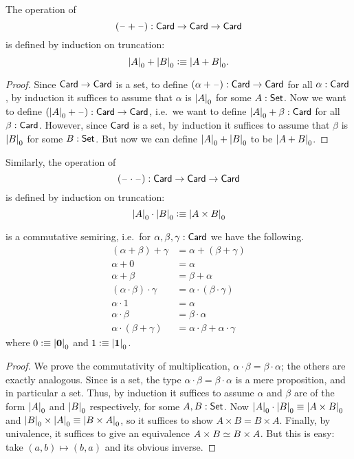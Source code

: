 \begin{defn}
  The operation of 
  \[ (\blank+\blank) : \card \to \card \to \card \]
  is defined by induction on truncation:
  \[ \cd{A} + \cd{B} \defeq \cd{A+B}.\]
\end{defn}
\begin{proof}
  Since $\card\to\card$ is a set, to define $(\alpha+\blank):\card\to\card$ for all $\alpha:\card$, by induction it suffices to assume that $\alpha$ is $\cd{A}$ for some $A:\set$.
  Now we want to define $(\cd{A}+\blank) :\card\to\card$, i.e.\ we want to define $\cd{A}+\beta :\card$ for all $\beta:\card$.
  However, since $\card$ is a set, by induction it suffices to assume that $\beta$ is $\cd{B}$ for some $B:\set$.
  But now we can define $\cd{A}+\cd{B}$ to be $\cd{A+B}$.
\end{proof}

\begin{defn}
  Similarly, the operation of 
  \[ (\blank\cdot\blank) : \card \to \card \to \card \]
  is defined by induction on truncation:
  \[ \cd{A} \cdot \cd{B} \defeq \cd{A\times B} \]
\end{defn}

\begin{lem}\label{card:semiring}
  \card is a commutative semiring, i.e.\ for $\alpha,\beta,\gamma:\card$ we have the following.
  \begin{align*}
    (\alpha+\beta)+\gamma &= \alpha+(\beta+\gamma)\\
    \alpha+0 &= \alpha\\
    \alpha + \beta &= \beta + \alpha\\
    (\alpha \cdot \beta) \cdot \gamma &= \alpha \cdot (\beta\cdot\gamma)\\
    \alpha \cdot 1 &= \alpha\\
    \alpha\cdot\beta &= \beta\cdot\alpha\\
    \alpha\cdot(\beta+\gamma) &= \alpha\cdot\beta + \alpha\cdot\gamma
  \end{align*}
  where $0 \defeq \cd{\emptyt}$ and $1\defeq\cd{\unit}$.
\end{lem}
\begin{proof}
  We prove the commutativity of multiplication, $\alpha\cdot\beta = \beta\cdot\alpha$; the others are exactly analogous.
  Since \card is a set, the type $\alpha\cdot\beta = \beta\cdot\alpha$ is a mere proposition, and in particular a set.
  Thus, by induction it suffices to assume $\alpha$ and $\beta$ are of the form $\cd{A}$ and $\cd{B}$ respectively, for some $A,B:\set$.
  Now $\cd{A}\cdot \cd{B} \jdeq \cd{A\times B}$ and $\cd{B}\times\cd{A} \jdeq \cd{B\times A}$, so it suffices to show $A\times B = B\times A$.
  Finally, by univalence, it suffices to give an equivalence $A\times B \eqvsym B\times A$.
  But this is easy: take $(a,b) \mapsto (b,a)$ and its obvious inverse.
\end{proof}

